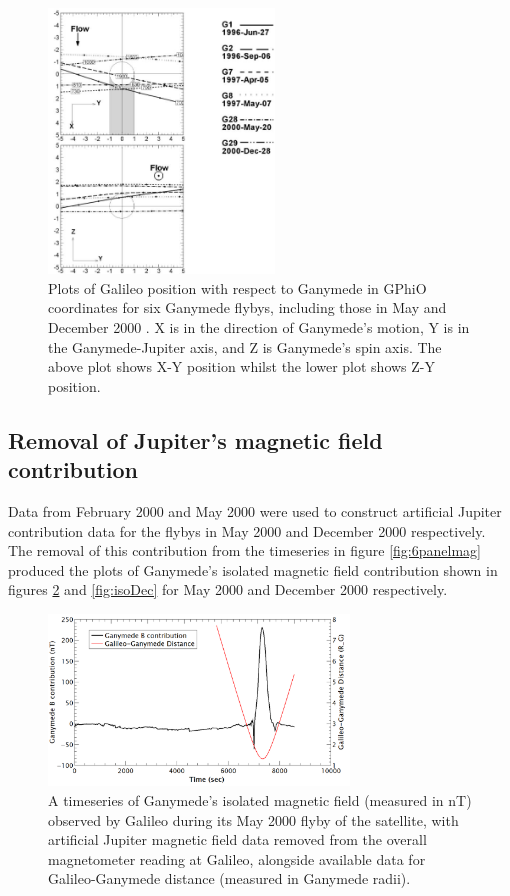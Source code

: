 \documentclass[11pt]{article}
\begin{document}
\begin{figure}[!htb]
    \centering
    \includegraphics[width=6cm]{galtraj.png}
    \captionsetup{width=13cm}
    \caption{Plots of Galileo position with respect to Ganymede in GPhiO coordinates for six Ganymede flybys, including those in May and December 2000 \cite{magrotation}. X is in the direction of Ganymede's motion, Y is in the Ganymede-Jupiter axis, and Z is Ganymede's spin axis. The above plot shows X-Y position whilst the lower plot shows Z-Y position.}
    \label{fig:flybytrajectory}
\end{figure}

\newpage
\subsection{Removal of Jupiter's magnetic field contribution}

Data from February 2000 and May 2000 were used to construct artificial Jupiter contribution data for the flybys in May 2000 and December 2000 respectively. The removal of this contribution from the timeseries in figure \ref{fig:6panelmag} produced the plots of Ganymede's isolated magnetic field contribution shown in figures \ref{fig:isoMay} and \ref{fig:isoDec} for May 2000 and December 2000 respectively.

\begin{figure}[!htb]
    \centering
    \includegraphics[width=8cm]{isoMay.png}
    \captionsetup{width=13cm}
    \caption{A timeseries of Ganymede's isolated magnetic field (measured in nT) observed by Galileo during its May 2000 flyby of the satellite, with artificial Jupiter magnetic field data removed from the overall magnetometer reading at Galileo, alongside available data for Galileo-Ganymede distance (measured in Ganymede radii).}
    \label{fig:isoMay}
\end{figure}
\end{document}
